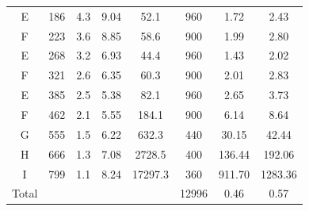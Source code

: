 \documentclass[]{spie}  %
\newcommand{\comr}[1]{\textcolor{red}{#1}}
\begin{document}
\begin{table}[ht]
\begin{tabular}{|c|c|c|c|c|c|c|c|}
E   & 186   & 4.3    & 9.04          & 52.1                 & 960         & 1.72                 & 2.43                     \\
F   & 223   & 3.6    & 8.85          & 58.6                 & 900         & 1.99                 & 2.80                     \\
E   & 268   & 3.2    & 6.93          & 44.4                 & 960         & 1.43                 & 2.02                    \\
F   & 321   & 2.6    & 6.35          & 60.3                 & 900         & 2.01                 & 2.83                   \\
E   & 385   & 2.5    & 5.38          & 82.1                 & 960         & 2.65                 & 3.73                    \\
F   & 462   & 2.1    & 5.55          & 184.1                & 900         & 6.14                 & 8.64                     \\
G   & 555   & 1.5    & 6.22          & 632.3                & 440         & 30.15                & 42.44                   \\
H   & 666   & 1.3    & 7.08          & 2728.5               & 400         & 136.44               & 192.06                  \\
I   & 799   & 1.1    & 8.24          & 17297.3              & 360         & 911.70               & 1283.36                 \\ \hline
Total &        &         &             &              & 12996         & 0.46              & 0.57               \\ \hline
\end{tabular}
\end{table}




\end{document}
